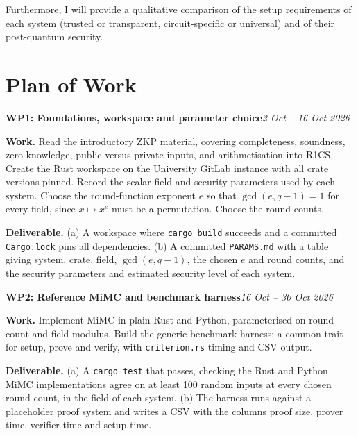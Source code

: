 \documentclass[11pt,a4paper]{article}
\begin{document}
Furthermore, I will provide a qualitative comparison of the setup requirements of each system (trusted or transparent, circuit-specific or universal) and of their post-quantum security.

\section{Plan of Work}

\newcommand{\wpkg}[5]{%
  \par\medskip\noindent\textbf{WP#1: #2}\hfill\textit{#3}\par\nobreak\smallskip
  \noindent\textbf{Work.} #4\par
  \noindent\textbf{Deliverable.} #5\par}

\wpkg{1}{Foundations, workspace and parameter choice}{2 Oct -- 16 Oct 2026}
{Read the introductory ZKP material, covering completeness, soundness, zero-knowledge, public versus private inputs, and arithmetisation into R1CS. Create the Rust workspace on the University GitLab instance with all crate versions pinned. Record the scalar field and security parameters used by each system. Choose the round-function exponent $e$ so that $\gcd(e, q-1) = 1$ for every field, since $x \mapsto x^e$ must be a permutation. Choose the round counts.}
{(a) A workspace where \texttt{cargo build} succeeds and a committed \texttt{Cargo.lock} pins all dependencies. (b) A committed \texttt{PARAMS.md} with a table giving system, crate, field, $\gcd(e, q-1)$, the chosen $e$ and round counts, and the security parameters and estimated security level of each system.}

\wpkg{2}{Reference MiMC and benchmark harness}{16 Oct -- 30 Oct 2026}
{Implement MiMC in plain Rust and Python, parameterised on round count and field modulus. Build the generic benchmark harness: a common trait for setup, prove and verify, with \texttt{criterion.rs} timing and CSV output.}
{(a) A \texttt{cargo test} that passes, checking the Rust and Python MiMC implementations agree on at least 100 random inputs at every chosen round count, in the field of each system. (b) The harness runs against a placeholder proof system and writes a CSV with the columns proof size, prover time, verifier time and setup time.}
\end{document}
